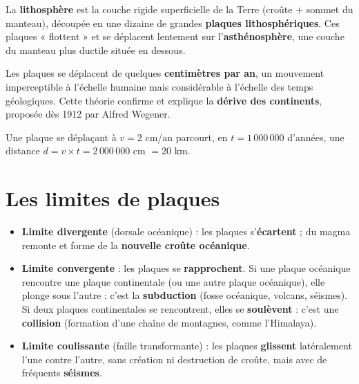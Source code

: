 \begin{definition}
La \textbf{lithosphère} est la couche rigide superficielle de la Terre (croûte $+$
sommet du manteau), découpée en une dizaine de grandes \textbf{plaques
lithosphériques}. Ces plaques « flottent » et se déplacent lentement sur
l'\textbf{asthénosphère}, une couche du manteau plus ductile située en dessous.
\end{definition}

\begin{propriete}
Les plaques se déplacent de quelques \textbf{centimètres par an}, un mouvement
imperceptible à l'échelle humaine mais considérable à l'échelle des temps géologiques.
Cette théorie confirme et explique la \textbf{dérive des continents}, proposée dès 1912
par Alfred Wegener.
\end{propriete}

\begin{exemple}
Une plaque se déplaçant à $v=2$ cm/an parcourt, en $t=1\,000\,000$ d'années, une
distance $d=v\times t=2\,000\,000$ cm $=20$ km.
\end{exemple}

\section{Les limites de plaques}

\begin{propriete}
\begin{itemize}
\item \textbf{Limite divergente} (dorsale océanique) : les plaques s'\textbf{écartent} ;
du magma remonte et forme de la \textbf{nouvelle croûte océanique}.
\item \textbf{Limite convergente} : les plaques se \textbf{rapprochent}. Si une plaque
océanique rencontre une plaque continentale (ou une autre plaque océanique), elle plonge
sous l'autre : c'est la \textbf{subduction} (fosse océanique, volcans, séismes). Si deux
plaques continentales se rencontrent, elles se \textbf{soulèvent} : c'est une
\textbf{collision} (formation d'une chaîne de montagnes, comme l'Himalaya).
\item \textbf{Limite coulissante} (faille transformante) : les plaques
\textbf{glissent} latéralement l'une contre l'autre, sans création ni destruction de
croûte, mais avec de fréquents \textbf{séismes}.
\end{itemize}
\end{propriete}

